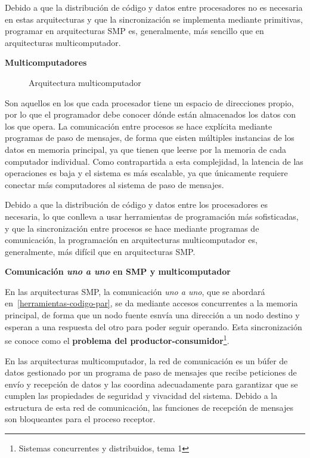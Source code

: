 Debido a que la distribución de código y datos entre procesadores no es necesaria en estas arquitecturas y que la sincronización se implementa mediante primitivas, programar en arquitecturas SMP es, generalmente, más sencillo que en arquitecturas multicomputador.

\textbf{Multicomputadores}

\begin{figure}[h]
\begin{center}

\end{center}
\caption{Arquitectura multicomputador}
\end{figure}

Son aquellos en los que cada procesador tiene un espacio de direcciones propio, por lo que el programador debe conocer dónde están almacenados los datos con los que opera.
La comunicación entre procesos se hace explícita mediante programas de paso de mensajes, de forma que eisten múltiples instancias de los datos en memoria principal, ya que tienen que leerse por la memoria de cada computador individual.
Como contrapartida a esta complejidad, la latencia de las operaciones es baja y el sistema es más escalable, ya que únicamente requiere conectar más computadores al sistema de paso de mensajes.

Debido a que la distribución de código y datos entre los procesadores es necesaria, lo que conlleva a usar herramientas de programación más sofisticadas, y que la sincronización entre procesos se hace mediante programas de comunicación, la programación en arquitecturas multicomputador es, generalmente, más difícil que en arquitecturas SMP\@.

\textbf{Comunicación \textit{uno a uno} en SMP y multicomputador}

En las arquitecturas SMP, la comunicación \textit{uno a uno}, que se abordará en~\ref{herramientas-codigo-par}, se da mediante accesos concurrentes a la memoria principal, de forma que un nodo fuente esnvía una dirección a un nodo destino y esperan a una respuesta del otro para poder seguir operando.
Esta sincronización se conoce como el \textbf{problema del productor-consumidor}\footnote{Sistemas concurrentes y distribuidos, tema 1}.

En las arquitecturas multicomputador, la red de comunicación es un búfer de datos gestionado por un programa de paso de mensajes que recibe peticiones de envío y recepción de datos y las coordina adecuadamente para garantizar que se cumplen las propiedades de seguridad y vivacidad del sistema.
Debido a la estructura de esta red de comunicación, las funciones de recepción de mensajes son bloqueantes para el proceso receptor.

